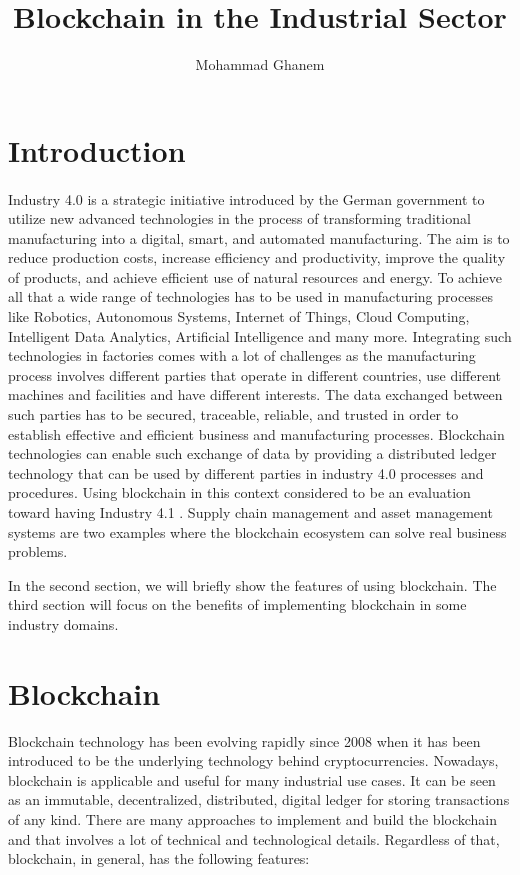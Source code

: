 \documentclass[runningheads]{llncs}
\begin{document}
\title{Blockchain in the Industrial Sector}
\author{Mohammad Ghanem}
\maketitle

\let\labelitemi\labelitemii

\section{Introduction \cite{Rojko2017}}

\paragraph{}

Industry 4.0 is a strategic initiative introduced by the German government to utilize new advanced technologies in the process of transforming traditional manufacturing into a digital, smart, and automated manufacturing.  The aim is to reduce production costs, increase efficiency and productivity, improve the quality of products, and achieve efficient use of natural resources and energy. To achieve all that a wide range of technologies has to be used in manufacturing processes like Robotics, Autonomous Systems, Internet of Things, Cloud Computing, Intelligent Data Analytics, Artificial Intelligence and many more. Integrating such technologies in factories comes with a lot of challenges as the manufacturing process involves different parties that operate in different countries, use different machines and facilities and have different interests. The data exchanged between such parties has to be secured, traceable, reliable, and trusted in order to establish effective and efficient business and manufacturing processes. Blockchain technologies can enable such exchange of data by providing a distributed ledger technology that can be used by different parties in industry 4.0 processes and procedures. Using blockchain in this context considered to be an evaluation toward having Industry 4.1 \cite{Internet2019}. Supply chain management and asset management systems are two examples where the blockchain ecosystem can solve real business problems.

In the second section, we will briefly show the features of using blockchain. The third section will focus on the benefits of implementing blockchain in some industry domains. 

\section{Blockchain \cite{Al-Jaroodi2019,Zheng2017}}
Blockchain technology has been evolving rapidly since 2008 when it has been introduced to be the underlying technology behind cryptocurrencies. Nowadays, blockchain is applicable and useful for many industrial use cases. It can be seen as an immutable, decentralized, distributed, digital ledger for storing transactions of any kind. There are many approaches to implement and build the blockchain and that involves a lot of technical and technological details. Regardless of that, blockchain, in general, has the following features:
\end{document}
